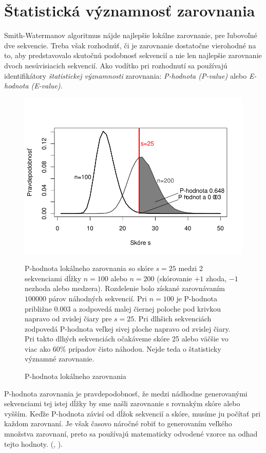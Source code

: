 \section[Štat. významnosť ]{Štatistická významnosť zarovnania}
Smith-Watermanov algoritmus nájde najlepšie lokálne zarovnanie, pre ľubovoľné dve sekvencie. Treba však rozhodnúť, či je zarovnanie dostatočne vierohodné na to, aby predstavovalo skutočnú podobnosť sekvencií a nie len najlepšie zarovnanie dvoch nesúvisiacich sekvencií.
Ako vodítko pri rozhodnutí sa používajú identifikátory \textit{štatistickej významnosti} zarovnania: \textit{P-hodnota (P-value)} alebo \textit{E-hodnota (E-value)}.

\begin{figure}[htp]
    \centering
    \includegraphics[width=.9\textwidth]{images/p-value}
    \caption{P-hodnota lokálneho zarovnania}
    P-hodnota lokálneho zarovnania so skóre $s = 25$ medzi 2 sekvenciami dĺžky $n = 100$ alebo $n = 200$ (skórovanie $+1$ zhoda, $-1$ nezhoda alebo medzera). Rozdelenie bolo získané zarovnávaním $100000$ párov náhodných sekvencií. Pri $n=100$ je P-hodnota približne 0.003 a zodpovedá malej čiernej poloche pod krivkou napravo od zvislej čiary pre $s=25$. Pri dlhšich sekvenciách zodpovedá P-hodnota veľkej sivej ploche napravo od zvislej čiary. Pri takto dlhých sekvenciách očakáveme skóre 25 alebo väčšie vo viac ako 60\% prípadov čisto náhodou. Nejde teda o štatisticky významné zarovnanie.
    \label{fig:p-value}
\end{figure}

P-hodnota zarovnania je pravdepodobnosť, že medzi nádhodne generovanými sekvenciami tej istej dĺžky by sme našli zarovnanie s rovnakým skóre alebo vyšším. Keďže P-hodnota závisí od dĺžok sekvencií a skóre, musíme ju počítať pri každom zarovnaní. Je však časovo náročné robiť to generovaním veľkého množstva zarovnaní, preto sa používajú matematicky odvodené vzorce na odhad tejto hodnoty. (\cite{Karlin}, \cite{Mitrophanov}).

